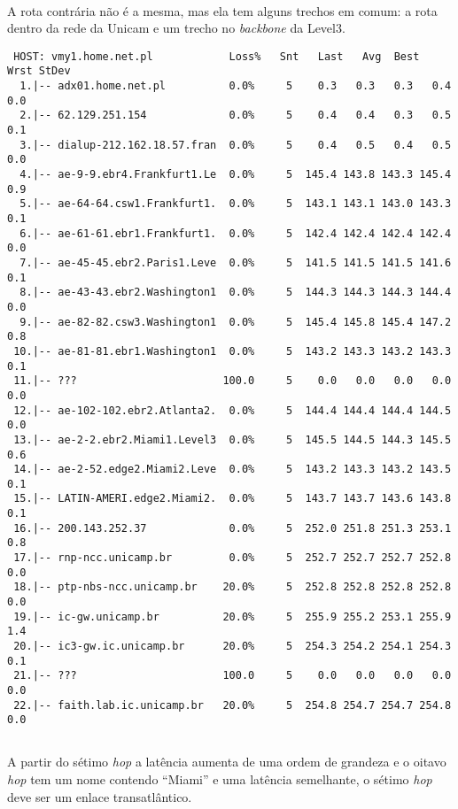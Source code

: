 \documentclass[a4paper,10pt,oneside,final,titlepage,onecolumn]{article}
\begin{document}
\paragraph{}A rota contrária não é a mesma, mas ela tem alguns trechos em comum: a rota dentro da rede da Unicam e um trecho no \emph{backbone} da Level3.
\begin{lstlisting}
 HOST: vmy1.home.net.pl            Loss%   Snt   Last   Avg  Best  Wrst StDev
  1.|-- adx01.home.net.pl          0.0%     5    0.3   0.3   0.3   0.4   0.0
  2.|-- 62.129.251.154             0.0%     5    0.4   0.4   0.3   0.5   0.1
  3.|-- dialup-212.162.18.57.fran  0.0%     5    0.4   0.5   0.4   0.5   0.0
  4.|-- ae-9-9.ebr4.Frankfurt1.Le  0.0%     5  145.4 143.8 143.3 145.4   0.9
  5.|-- ae-64-64.csw1.Frankfurt1.  0.0%     5  143.1 143.1 143.0 143.3   0.1
  6.|-- ae-61-61.ebr1.Frankfurt1.  0.0%     5  142.4 142.4 142.4 142.4   0.0
  7.|-- ae-45-45.ebr2.Paris1.Leve  0.0%     5  141.5 141.5 141.5 141.6   0.1
  8.|-- ae-43-43.ebr2.Washington1  0.0%     5  144.3 144.3 144.3 144.4   0.0
  9.|-- ae-82-82.csw3.Washington1  0.0%     5  145.4 145.8 145.4 147.2   0.8
 10.|-- ae-81-81.ebr1.Washington1  0.0%     5  143.2 143.3 143.2 143.3   0.1
 11.|-- ???                       100.0     5    0.0   0.0   0.0   0.0   0.0
 12.|-- ae-102-102.ebr2.Atlanta2.  0.0%     5  144.4 144.4 144.4 144.5   0.0
 13.|-- ae-2-2.ebr2.Miami1.Level3  0.0%     5  145.5 144.5 144.3 145.5   0.6
 14.|-- ae-2-52.edge2.Miami2.Leve  0.0%     5  143.2 143.3 143.2 143.5   0.1
 15.|-- LATIN-AMERI.edge2.Miami2.  0.0%     5  143.7 143.7 143.6 143.8   0.1
 16.|-- 200.143.252.37             0.0%     5  252.0 251.8 251.3 253.1   0.8
 17.|-- rnp-ncc.unicamp.br         0.0%     5  252.7 252.7 252.7 252.8   0.0
 18.|-- ptp-nbs-ncc.unicamp.br    20.0%     5  252.8 252.8 252.8 252.8   0.0
 19.|-- ic-gw.unicamp.br          20.0%     5  255.9 255.2 253.1 255.9   1.4
 20.|-- ic3-gw.ic.unicamp.br      20.0%     5  254.3 254.2 254.1 254.3   0.1
 21.|-- ???                       100.0     5    0.0   0.0   0.0   0.0   0.0
 22.|-- faith.lab.ic.unicamp.br   20.0%     5  254.8 254.7 254.7 254.8   0.0
\end{lstlisting}

\subsection{}
\paragraph{}A partir do sétimo \emph{hop} a latência aumenta de uma ordem de grandeza e o oitavo \emph{hop} tem um nome contendo ``Miami'' e uma latência semelhante, o sétimo \emph{hop} deve ser um enlace transatlântico.
\end{document}
